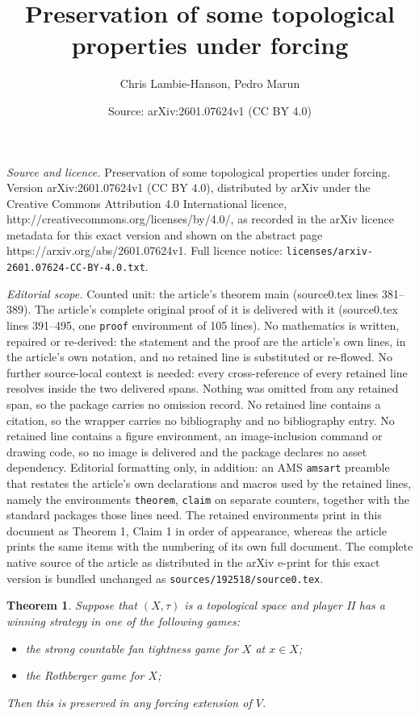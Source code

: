 \documentclass[10pt,a4paper]{amsart}
\title{Preservation of some topological properties under forcing}
\author{Chris Lambie-Hanson, Pedro Marun}
\date{Source: arXiv:2601.07624v1 (CC BY 4.0)}
\newtheorem{theorem}{Theorem}
\begin{document}
\maketitle

\noindent\emph{Source and licence.} Preservation of some topological properties under forcing. Version arXiv:2601.07624v1 (CC BY 4.0), distributed by arXiv under the Creative Commons Attribution 4.0 International licence, http://creativecommons.org/licenses/by/4.0/, as recorded in the arXiv licence metadata for this exact version and shown on the abstract page https://arxiv.org/abs/2601.07624v1. Full licence notice: \texttt{licenses/arxiv-2601.07624-CC-BY-4.0.txt}.\par\smallskip

\noindent\textit{Editorial scope.} Counted unit: the article's theorem main (source0.tex lines 381--389). The article's complete original proof of it is delivered with it (source0.tex lines 391--495, one \texttt{proof} environment of 105 lines). No mathematics is written, repaired or re-derived: the statement and the proof are the article's own lines, in the article's own notation, and no retained line is substituted or re-flowed.  No further source-local context is needed: every cross-reference of every retained line resolves inside the two delivered spans.  Nothing was omitted from any retained span, so the package carries no omission record.  No retained line contains a citation, so the wrapper carries no bibliography and no bibliography entry.  No retained line contains a figure environment, an image-inclusion command or drawing code, so no image is delivered and the package declares no asset dependency.  Editorial formatting only, in addition: an AMS \texttt{amsart} preamble that restates the article's own declarations and macros used by the retained lines, namely the environments \texttt{theorem}, \texttt{claim} on separate counters, together with the standard packages those lines need.  The retained environments print in this document as Theorem 1, Claim 1 in order of appearance, whereas the article prints the same items with the numbering of its own full document.  The complete native source of the article as distributed in the arXiv e-print for this exact version is bundled unchanged as \texttt{sources/192518/source0.tex}.
\begin{theorem}\label{main}
  Suppose that $(X, \tau)$ is a topological space and player II has a winning strategy in one of the following games:
\begin{itemize}
\item the strong countable fan tightness game for $X$ at $x\in X$;
\item the Rothberger game for $X$;
\end{itemize}
Then this is preserved in any forcing extension of $V$.
\end{theorem}
\end{document}
